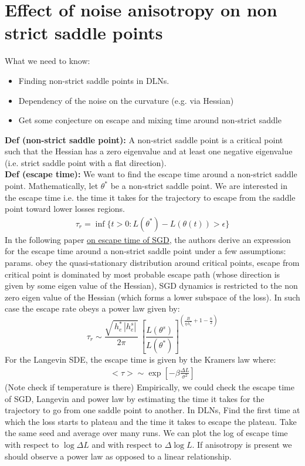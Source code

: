 \documentclass[11pt]{article}
\begin{document}
\section{Effect of noise anisotropy on non strict saddle points}
What we need to know:
\begin{itemize}
    \item Finding non-strict saddle points in DLNs.
    \item Dependency of the noise on the curvature (e.g. via Hessian)
    \item Get some conjecture on escape and mixing time around non-strict saddle
\end{itemize}
\textbf{Def (non-strict saddle point):} A non-strict saddle point is a critical point such that the Hessian has a zero eigenvalue and at least one negative eigenvalue (i.e. strict saddle point with a flat direction).
\\
\textbf{Def (escape time):} We want to find the escape time around a non-strict saddle point. Mathematically, let $\theta^*$ be a non-strict saddle point. We are interested in the escape time i.e. the time it takes for the trajectory to escape from the saddle point toward lower losses regions.
\begin{align}
    \tau_r = \inf\{t > 0: L(\theta^*) - L(\theta(t)) > \epsilon\}
\end{align}
In the following paper \href{https://arxiv.org/pdf/2105.09557#page=5.74}{on escape time of SGD}, the authors derive an expression for the escape time around a non-strict saddle point under a few assumptions: params. obey the quasi-stationary distribution around critical points, escape from critical point is dominated by most probable escape path (whose direction is given by some eigen value of the Hessian), SGD dynamics is restricted to the non zero eigen value of the Hessian (which forms a lower subspace of the loss). In such case the escape rate obeys a power law given by:
\[
\tau_r \sim 
\frac{\sqrt{\,h_e^{*}\,|h_e^{s}|\,}}{2\pi}\,
\left[\frac{L(\theta^{s})}{L(\theta^{*})}\right]^{
\left(\frac{B}{\eta\,h_e^{*}} + 1 - \frac{n}{2}\right)}
\]
For the Langevin SDE, the escape time is given by the Kramers law where:
\begin{align}
    <\tau> \sim \exp[-\beta\frac{\Delta L}{\sigma^2}]
\end{align}
(Note check if temperature is there)
Empirically, we could check the escape time of SGD, Langevin and power law by estimating the time it takes for the trajectory to go from one saddle point to another. In DLNs, Find the first time at which the loss starts to plateau and the time it takes to escape the plateau. Take the same seed and average over many runs. We can plot the log of escape time with respect to $\log\Delta L$ and with respect to $\Delta \log L$. If anisotropy is present we should observe a power law as opposed to a linear relationship.
\end{document}
